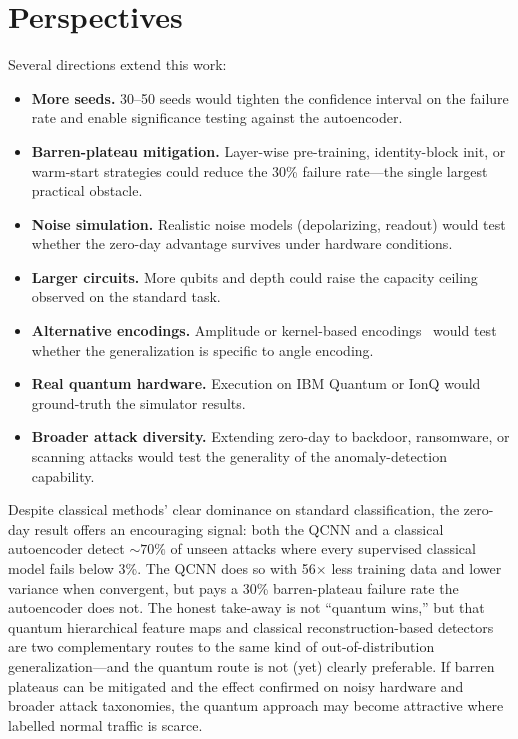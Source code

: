 \documentclass[twoside,openany,a4paper,11pt,english]{report}
\begin{document}
\section*{Perspectives}

Several directions extend this work:

\begin{itemize}[nosep]
    \item \textbf{More seeds.} 30--50 seeds would tighten the confidence interval on the failure rate and enable significance testing against the autoencoder.
    \item \textbf{Barren-plateau mitigation.} Layer-wise pre-training, identity-block init, or warm-start strategies could reduce the 30\% failure rate---the single largest practical obstacle.
    \item \textbf{Noise simulation.} Realistic noise models (depolarizing, readout) would test whether the zero-day advantage survives under hardware conditions.
    \item \textbf{Larger circuits.} More qubits and depth could raise the capacity ceiling observed on the standard task.
    \item \textbf{Alternative encodings.} Amplitude or kernel-based encodings~\cite{havlicek2019supervised} would test whether the generalization is specific to angle encoding.
    \item \textbf{Real quantum hardware.} Execution on IBM Quantum or IonQ would ground-truth the simulator results.
    \item \textbf{Broader attack diversity.} Extending zero-day to backdoor, ransomware, or scanning attacks would test the generality of the anomaly-detection capability.
\end{itemize}

Despite classical methods' clear dominance on standard classification, the zero-day result offers an encouraging signal: both the QCNN and a classical autoencoder detect ${\sim}70\%$ of unseen attacks where every supervised classical model fails below 3\%. The QCNN does so with 56$\times$ less training data and lower variance when convergent, but pays a 30\% barren-plateau failure rate the autoencoder does not. The honest take-away is not ``quantum wins,'' but that quantum hierarchical feature maps and classical reconstruction-based detectors are two complementary routes to the same kind of out-of-distribution generalization---and the quantum route is not (yet) clearly preferable. If barren plateaus can be mitigated and the effect confirmed on noisy hardware and broader attack taxonomies, the quantum approach may become attractive where labelled normal traffic is scarce.
\end{document}
